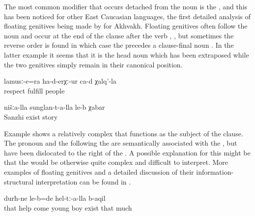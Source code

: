 The most common modifier that occurs detached from the noun is the , and this has been noticed for other East Caucasian languages, the first detailed analysis of floating genitives being made by \citet{Creissels2013} for Akhvakh. Floating genitives often follow the noun and occur at the end of the clause after the verb , , but sometimes the reverse order is found in which case the  precedes a clause-final noun . In the latter example it seems that it is the head noun which has been extraposed while the two genitives simply remain in their canonical position. 

%
\begin{exe}
	\ex	\label{ex:The people's respect also finished}
	\gll	lamusː-e=ra	ha-d-erχː-ur	ca-d	χalq'-la\\
		respect	fulfill		people\\
	\glt	{}

	\ex	\label{ex:‎We Sanzhi people have a story}
	\gll	nišːa-lla	sunglan-t-a-lla	le-b	χabar\\
			Sanzhi	exist	story\\
	\glt	{}
\end{exe}


Example  shows a relatively complex  that functions as the subject of the  clause. The  pronoun and the  following the  are semantically associated with the , but have been dislocated to the right of the . A possible explanation for this might be that the  would be otherwise quite complex and difficult to interpret. More examples of floating genitives and a detailed discussion of their information-structural interpretation can be found in . 
%
\begin{exe}
	\ex	\label{ex:‎They had many young boys who had come to help}
		durħ-ne	le-b=de hel-tː-a-lla	b-aqil\\
		that	help	come	young	boy	exist	that	much\\
	\glt	{}
\end{exe}

